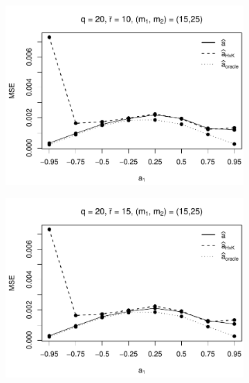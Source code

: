 \begin{figure}[h!]
\begin{subfigure}[b]{0.45\textwidth}
\includegraphics[width=\textwidth]{Plots/Robustness/MSE_a1_T=500_slope=1_(q,K1,K2,M1,M2)=(20,2,10,15,25).pdf}
\end{subfigure}
\hspace{0.25cm}
\begin{subfigure}[b]{0.45\textwidth}
\includegraphics[width=\textwidth]{Plots/Robustness/MSE_a1_T=500_slope=1_(q,K1,K2,M1,M2)=(20,2,15,15,25).pdf}
\end{subfigure}


\end{figure}

